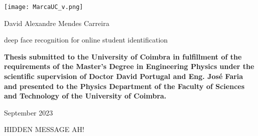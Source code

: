 \documentclass[class=report, crop=false, a4paper]{standalone}
\begin{document}

\pagecolor{CoverUC}\afterpage{\nopagecolor}

\begin{center}
    \color{CoverUCTypo}
    \texttt{[image: MarcaUC\_v.png]}
    \vspace{3cm}

    \fontsize{18pt}{18pt}\selectfont
    \par{\ArrusBt David Alexandre Mendes Carreira}
    \vspace{3cm}

    \fontsize{22pt}{22pt}\selectfont
    \par{\ArrusBtScB deep face recognition for online student identification}
    \fontsize{20pt}{20pt}\selectfont
    \vspace{2cm}

    \vfill
    \fontsize{12pt}{12pt}\selectfont
    \par\textbf{\ArrusBt Thesis submitted to the University of Coimbra in fulfillment of the
    requirements of the Master’s Degree in Engineering Physics
    under the scientific supervision of Doctor David Portugal and Eng.
    José Faria and presented to the Physics Department of the
    Faculty of Sciences and Technology of the University of Coimbra.}
    
    \vfill
    \fontsize{16pt}{16pt}\selectfont
    \par {\ArrusBt September 2023}
\end{center}
\restoregeometry

\newpage
\color{white}\selectfont
HIDDEN MESSAGE AH!
\newpage
\end{document}
